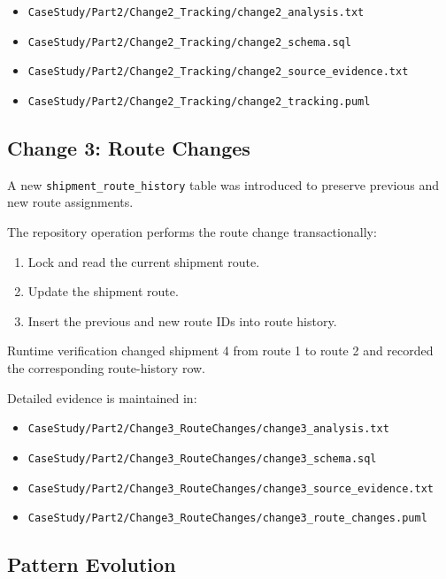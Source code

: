 \documentclass[12pt,a4paper]{article}
\begin{document}
\begin{itemize}
    \item \texttt{CaseStudy/Part2/Change2\_Tracking/change2\_analysis.txt}
    \item \texttt{CaseStudy/Part2/Change2\_Tracking/change2\_schema.sql}
    \item \texttt{CaseStudy/Part2/Change2\_Tracking/change2\_source\_evidence.txt}
    \item \texttt{CaseStudy/Part2/Change2\_Tracking/change2\_tracking.puml}
\end{itemize}

\subsection{Change 3: Route Changes}

A new \texttt{shipment\_route\_history} table was introduced to preserve previous and new route assignments.

The repository operation performs the route change transactionally:

\begin{enumerate}
    \item Lock and read the current shipment route.
    \item Update the shipment route.
    \item Insert the previous and new route IDs into route history.
\end{enumerate}

Runtime verification changed shipment 4 from route 1 to route 2 and recorded the corresponding route-history row.

Detailed evidence is maintained in:

\begin{itemize}
    \item \texttt{CaseStudy/Part2/Change3\_RouteChanges/change3\_analysis.txt}
    \item \texttt{CaseStudy/Part2/Change3\_RouteChanges/change3\_schema.sql}
    \item \texttt{CaseStudy/Part2/Change3\_RouteChanges/change3\_source\_evidence.txt}
    \item \texttt{CaseStudy/Part2/Change3\_RouteChanges/change3\_route\_changes.puml}
\end{itemize}

\subsection{Pattern Evolution}
\end{document}

